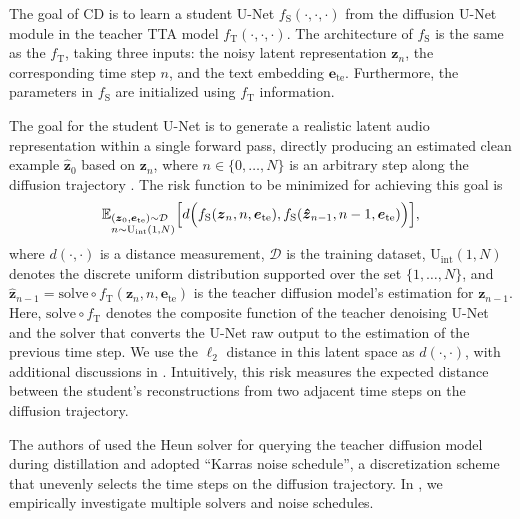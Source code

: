 \documentclass{article}
\newcommand{\et}{\boldsymbol{e}_\mathrm{te}}
\newcommand{\sz}{\boldsymbol{z}}
\newcommand{\shatz}{\boldsymbol{\hat{z}}}
\newcommand{\fstu}{f_{\mathrm{S}}}
\newcommand{\ftea}{f_{\mathrm{T}}}
\newcommand{\Uint}{\mathrm{U_{int}}}
\newcommand{\solve}{\mathrm{solve}}
\begin{document}
The goal of CD is to learn a student U-Net $\fstu (\cdot, \cdot, \cdot)$ from the diffusion U-Net module in the teacher TTA model $\ftea (\cdot, \cdot, \cdot)$. The architecture of $\fstu$ is the same as the $\ftea$, taking three inputs: the noisy latent representation $\sz_n$, the corresponding time step $n$, and the text embedding $\et$. Furthermore, the parameters in $\fstu$ are initialized using $\ftea$ information.

The goal for the student U-Net is to generate a realistic latent audio representation within a single forward pass, directly producing an estimated clean example $\shatz_0$ based on $\sz_n$, where $n \in \{0, \ldots, N\}$ is an arbitrary step along the diffusion trajectory \cite[Algorithm 2]{cm}. The risk function to be minimized for achieving this goal is
\vspace{-.4mm}
\begin{equation} \label{eq:consis_risk}
    \mathbb{E}_{\substack{(\sz_0, \et) \sim \mathcal{D} \hfill \\ n \sim \Uint(1, N)}} \Big[ d \Big( \fstu (\sz_n, n, \et), \fstu (\shatz_{n-1}, n-1, \et) \Big) \Big],
    \vspace{-.4mm}
\end{equation}
where $d (\cdot, \cdot)$ is a distance measurement, $\mathcal{D}$ is the training dataset, $\Uint (1, N)$ denotes the discrete uniform distribution supported over the set $\{1, \ldots, N\}$, and $\shatz_{n-1} = \solve \circ \ftea(\sz_n, n, \et)$ is the teacher diffusion model's estimation for $\sz_{n-1}$. Here, $\solve \circ \ftea$ denotes the composite function of the teacher denoising U-Net and the solver that converts the U-Net raw output to the estimation of the previous time step. We use the $\ell_2$ distance in this latent space as $d (\cdot, \cdot)$, with additional discussions in . Intuitively, this risk measures the expected distance between the student's reconstructions from two adjacent time steps on the diffusion trajectory.

The authors of \cite{cm} used the Heun solver for querying the teacher diffusion model during distillation and adopted ``Karras noise schedule'', a discretization scheme that unevenly selects the time steps on the diffusion trajectory. In , we empirically investigate multiple solvers and noise schedules.
\end{document}
